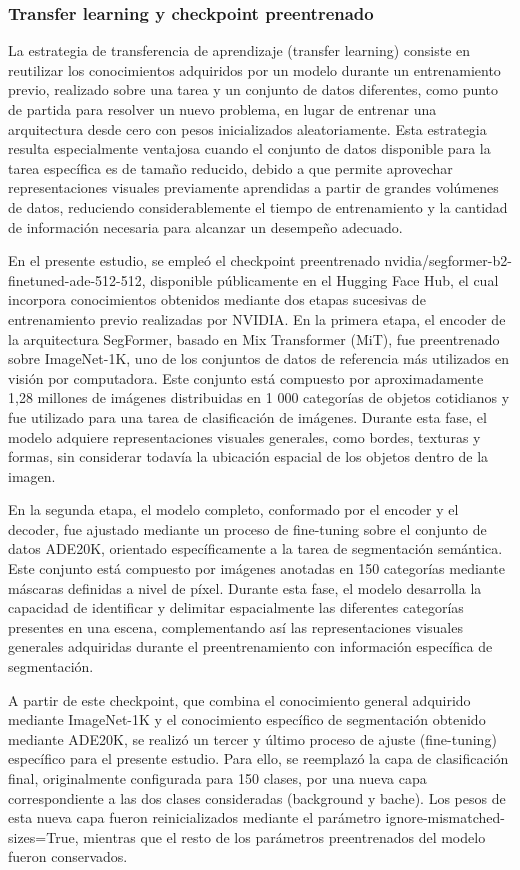 \subsubsection{Transfer learning y checkpoint preentrenado}
La estrategia de transferencia de aprendizaje (transfer learning) consiste en reutilizar los conocimientos adquiridos por un modelo durante un entrenamiento previo, realizado sobre una tarea y un conjunto de datos diferentes, como punto de partida para resolver un nuevo problema, en lugar de entrenar una arquitectura desde cero con pesos inicializados aleatoriamente. Esta estrategia resulta especialmente ventajosa cuando el conjunto de datos disponible para la tarea específica es de tamaño reducido, debido a que permite aprovechar representaciones visuales previamente aprendidas a partir de grandes volúmenes de datos, reduciendo considerablemente el tiempo de entrenamiento y la cantidad de información necesaria para alcanzar un desempeño adecuado.

En el presente estudio, se empleó el checkpoint preentrenado nvidia/segformer-b2-finetuned-ade-512-512, disponible públicamente en el Hugging Face Hub, el cual incorpora conocimientos obtenidos mediante dos etapas sucesivas de entrenamiento previo realizadas por NVIDIA. En la primera etapa, el encoder de la arquitectura SegFormer, basado en Mix Transformer (MiT), fue preentrenado sobre ImageNet-1K, uno de los conjuntos de datos de referencia más utilizados en visión por computadora. Este conjunto está compuesto por aproximadamente 1,28 millones de imágenes distribuidas en 1 000 categorías de objetos cotidianos y fue utilizado para una tarea de clasificación de imágenes. Durante esta fase, el modelo adquiere representaciones visuales generales, como bordes, texturas y formas, sin considerar todavía la ubicación espacial de los objetos dentro de la imagen.

En la segunda etapa, el modelo completo, conformado por el encoder y el decoder, fue ajustado mediante un proceso de fine-tuning sobre el conjunto de datos ADE20K, orientado específicamente a la tarea de segmentación semántica. Este conjunto está compuesto por imágenes anotadas en 150 categorías mediante máscaras definidas a nivel de píxel. Durante esta fase, el modelo desarrolla la capacidad de identificar y delimitar espacialmente las diferentes categorías presentes en una escena, complementando así las representaciones visuales generales adquiridas durante el preentrenamiento con información específica de segmentación.

A partir de este checkpoint, que combina el conocimiento general adquirido mediante ImageNet-1K y el conocimiento específico de segmentación obtenido mediante ADE20K, se realizó un tercer y último proceso de ajuste (fine-tuning) específico para el presente estudio. Para ello, se reemplazó la capa de clasificación final, originalmente configurada para 150 clases, por una nueva capa correspondiente a las dos clases consideradas (background y bache). Los pesos de esta nueva capa fueron reinicializados mediante el parámetro ignore-mismatched-sizes=True, mientras que el resto de los parámetros preentrenados del modelo fueron conservados.

